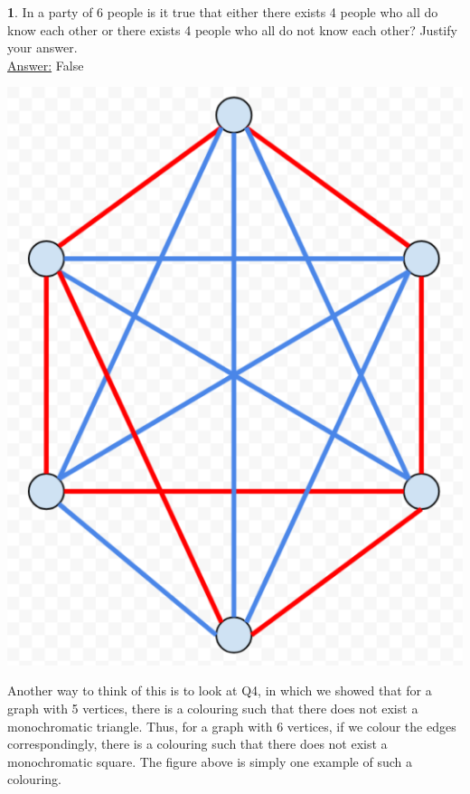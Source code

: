 \documentclass[12pt,a4paper]{article}
\theoremstyle{definition}
\newtheorem{problem}{}
\begin{document}
\begin{problem}
In a party of 6 people is it true that  either there exists 4 people  who all do know each other or there exists 4 people who all do not know each other? Justify your answer. \\

\underline{Answer:} False \\
\centerline{\includegraphics[scale=0.4]{q5.png}}

Another way to think of this is to look at Q4, in which we showed that for a graph with 5 vertices, there is a colouring such that there does not exist a monochromatic triangle. Thus, for a graph with 6 vertices, if we colour the edges correspondingly, there is a colouring such that there does not exist a monochromatic square. The figure above is simply one example of such a colouring.

\end{problem}
\end{document}
